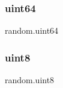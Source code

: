 \subsubsection{\texorpdfstring{uint64}{uint64}}
{\footnotesize\ttfamily random.\+uint64}

\mbox{\label{namespacerandom_ab223bc38deb9851606047af1d4bfe898}} 
\subsubsection{\texorpdfstring{uint8}{uint8}}
{\footnotesize\ttfamily random.\+uint8}

